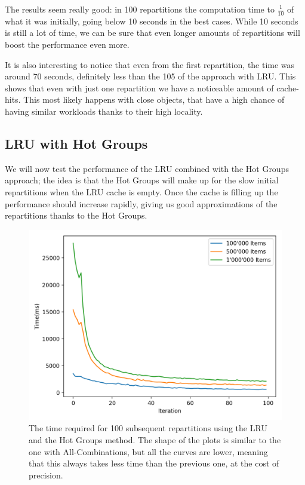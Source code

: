 The results seem really good: in 100 repartitions the computation time to $\frac{1}{10}$ of what it was initially, going below 10 seconds in the best cases. While 10 seconds is still a lot of time, we can be sure that even longer amounts of repartitions will boost the performance even more. 

It is also interesting to notice that even from the first repartition, the time was around 70 seconds, definitely less than the 105 of the approach with LRU. This shows that even with just one repartition we have a noticeable amount of cache-hits. This most likely happens with close objects, that have a high chance of having similar workloads thanks to their high locality.

\subsection{LRU with Hot Groups}\label{sec:lru-hot-groups}
We will now test the performance of the LRU combined with the Hot Groups approach; the idea is that the Hot Groups will make up for the slow initial repartitions when the LRU cache is empty. Once the cache is filling up the performance should increase rapidly, giving us good approximations of the repartitions thanks to the Hot Groups. 

\begin{figure}[!htb]
  \centering
  \includegraphics[width=\textwidth,height=\textheight,keepaspectratio]{img/LRU_8_hot.png}
  \caption[caption]{The time required for 100 subsequent repartitions using the LRU and the Hot Groups method. The shape of the plots is similar to the one with All-Combinations, but all the curves are lower, meaning that this always takes less time than the previous one, at the cost of precision.}
  \label{fig:LRU_8_hot}
\end{figure}

